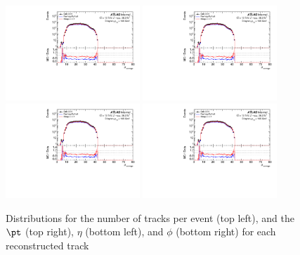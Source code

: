 \begin{figure}[h!]
  \centering
  \includegraphics[page=128,width=0.45\textwidth]{figures/ZjetOmnifoldMCDataComp.pdf}
  \includegraphics[page=144,width=0.45\textwidth]{figures/ZjetOmnifoldMCDataComp.pdf} \\
  \includegraphics[page=148,width=0.45\textwidth]{figures/ZjetOmnifoldMCDataComp.pdf}
  \includegraphics[page=152,width=0.45\textwidth]{figures/ZjetOmnifoldMCDataComp.pdf}
  \caption{Distributions for the number of tracks per event (top left), and the $\pt$ (top right), $\eta$ (bottom left), and $\phi$ (bottom right) for each reconstructed track}
  \label{fig:trackInfo}
\end{figure}

\clearpage
